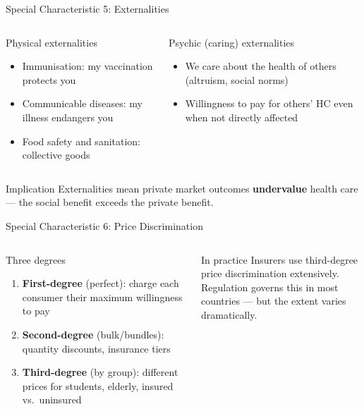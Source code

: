 \documentclass[aspectratio=169, 12pt]{beamer}
\begin{document}
\begin{frame}{Special Characteristic 5: Externalities}
	\begin{columns}
		\begin{block}{Physical externalities}
			\begin{itemize}
				\item Immunisation: my vaccination protects you
				\item Communicable diseases: my illness endangers you
				\item Food safety and sanitation: collective goods
			\end{itemize}
		\end{block}
		\begin{block}{Psychic (caring) externalities}
			\begin{itemize}
				\item We care about the health of others (altruism, social norms)
				\item Willingness to pay for others' HC even when not directly affected
			\end{itemize}
		\end{block}
	\end{columns}
	\vspace{0.5em}
	\begin{alertblock}{Implication}
		Externalities mean private market outcomes \textbf{undervalue} health care ---
		the social benefit exceeds the private benefit.
	\end{alertblock}
\end{frame}

\begin{frame}{Special Characteristic 6: Price Discrimination}
	\begin{columns}
		\column{0.55\textwidth}
		\begin{block}{Three degrees}
			\begin{enumerate}
				\item \textbf{First-degree} (perfect): charge each consumer their maximum willingness to pay
				\item \textbf{Second-degree} (bulk/bundles): quantity discounts, insurance tiers
				\item \textbf{Third-degree} (by group): different prices for students, elderly, insured vs.\ uninsured
			\end{enumerate}
		\end{block}
		\column{0.42\textwidth}
		\begin{alertblock}{In practice}
			Insurers use third-degree price discrimination extensively.\\[0.4em]
			Regulation governs this in most countries --- but the extent varies dramatically.
		\end{alertblock}
	\end{columns}
\end{frame}
\end{document}

